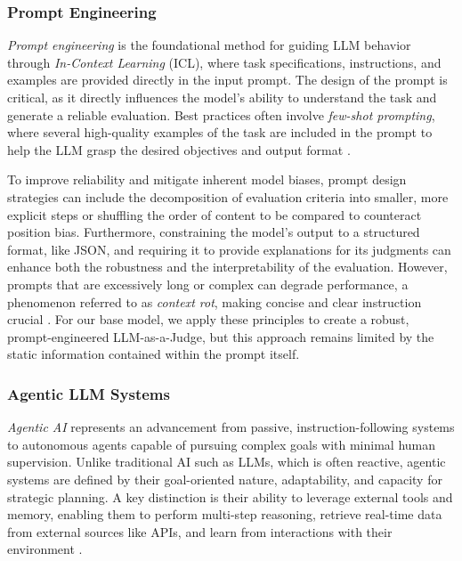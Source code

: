 \documentclass[conference]{IEEEtran}
\begin{document}
\subsubsection{Prompt Engineering}

\textit{Prompt engineering} is the foundational method for guiding LLM behavior through \textit{In-Context Learning} (ICL), where task specifications, instructions, and examples are provided directly in the input prompt. The design of the prompt is critical, as it directly influences the model's ability to understand the task and generate a reliable evaluation. Best practices often involve \textit{few-shot prompting}, where several high-quality examples of the task are included in the prompt to help the LLM grasp the desired objectives and output format \cite{gu_survey_2025,sahoo_systematic_2025}.

To improve reliability and mitigate inherent model biases, prompt design strategies can include the decomposition of evaluation criteria into smaller, more explicit steps or shuffling the order of content to be compared to counteract position bias. Furthermore, constraining the model's output to a structured format, like JSON, and requiring it to provide explanations for its judgments can enhance both the robustness and the interpretability of the evaluation. However, prompts that are excessively long or complex can degrade performance, a phenomenon referred to as \textit{context rot}, making concise and clear instruction crucial \cite{hong_context_2025}. For our base model, we apply these principles to create a robust, prompt-engineered LLM-as-a-Judge, but this approach remains limited by the static information contained within the prompt itself.

\subsubsection{Agentic LLM Systems}

\textit{Agentic AI} represents an advancement from passive, instruction-following systems to autonomous agents capable of pursuing complex goals with minimal human supervision. Unlike traditional AI such as LLMs, which is often reactive, agentic systems are defined by their goal-oriented nature, adaptability, and capacity for strategic planning. A key distinction is their ability to leverage external tools and memory, enabling them to perform multi-step reasoning, retrieve real-time data from external sources like APIs, and learn from interactions with their environment \cite{kamoi_when_2024,hughes_ai_2025,acharya_agentic_2025}.
\end{document}
